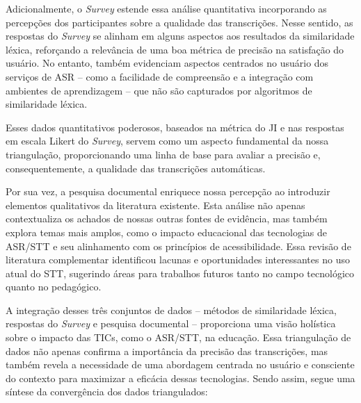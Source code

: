 Adicionalmente, o \textit{Survey} estende essa análise quantitativa incorporando as percepções dos participantes sobre a qualidade das transcrições. Nesse sentido, as respostas do \textit{Survey} se alinham em alguns aspectos aos resultados da similaridade léxica, reforçando a relevância de uma boa métrica de precisão na satisfação do usuário. No entanto, também evidenciam aspectos centrados no usuário dos serviços de ASR -- como a facilidade de compreensão e a integração com ambientes de aprendizagem -- que não são capturados por algoritmos de similaridade léxica.

Esses dados quantitativos poderosos, baseados na métrica do JI e nas respostas em escala Likert do \textit{Survey}, servem como um aspecto fundamental da nossa triangulação, proporcionando uma linha de base para avaliar a precisão e, consequentemente, a qualidade das transcrições automáticas.

Por sua vez, a pesquisa documental enriquece nossa percepção ao introduzir elementos qualitativos da literatura existente. Esta análise não apenas contextualiza os achados de nossas outras fontes de evidência, mas também explora temas mais amplos, como o impacto educacional das tecnologias de ASR/STT e seu alinhamento com os princípios de acessibilidade. Essa revisão de literatura complementar identificou lacunas e oportunidades interessantes no uso atual do STT, sugerindo áreas para trabalhos futuros tanto no campo tecnológico quanto no pedagógico.

A integração desses três conjuntos de dados -- métodos de similaridade léxica, respostas do \textit{Survey} e pesquisa documental -- proporciona uma visão holística sobre o impacto das TICs, como o ASR/STT, na educação. Essa triangulação de dados não apenas confirma a importância da precisão das transcrições, mas também revela a necessidade de uma abordagem centrada no usuário e consciente do contexto para maximizar a eficácia dessas tecnologias. Sendo assim, segue uma síntese da convergência dos dados triangulados:

